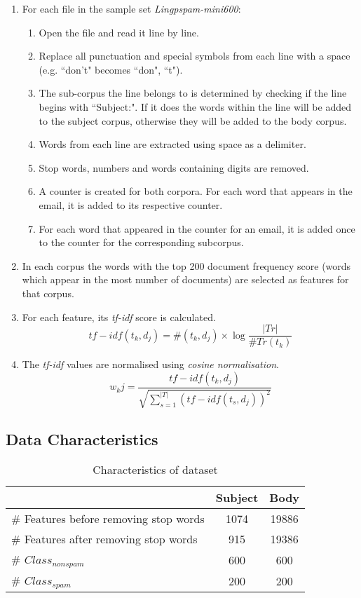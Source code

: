 \documentclass[10pt, a4paper]{article}
\begin{document}
\begin{enumerate}
\item For each file in the sample set \emph{Lingpspam-mini600}:
	\begin{enumerate}[label*=\arabic*.]
	\item Open the file and read it line by line.
	\item Replace all punctuation and special symbols from each line with a space (e.g. ``don't" becomes ``don", ``t").
	\item The sub-corpus the line belongs to is determined by checking if the line begins with ``Subject:". If it does the words within the line will be added to the subject corpus, otherwise they will be added to the body corpus.
	\item Words from each line are extracted using space as a delimiter.
	\item Stop words, numbers and words containing digits are removed.
	\item A counter is created for both corpora. For each word that appears in the email, it is added to its respective counter.
	\item For each word that appeared in the counter for an email, it is added once to the counter for the corresponding subcorpus.
	\end{enumerate}
\item In each corpus the words with the top 200 document frequency score (words which appear in the most number of documents) are selected as features for that corpus.
\item For each feature, its \emph{tf-idf} score is calculated.
$$ tf-idf(t_k, d_j) = \#(t_k, d_j) \times \log \frac{|Tr|}{\#Tr(t_k)} $$
\item The \emph{tf-idf} values are normalised using \emph{cosine normalisation}.
$$ w_kj = \frac{tf-idf(t_k, d_j)}{\sqrt{\sum_{s=1}^{|T|} (tf-idf(t_s, d_j))^2 }} $$
\end{enumerate}

\subsection{Data Characteristics}

\setlength\extrarowheight{3pt}
\begin{table}[H]
\centering
\caption{Characteristics of dataset}\vspace{1em}
\begin{tabular}{|l||c|c|}
\hline
& \textbf{Subject} & \textbf{Body} \\
\hline\hline
\# Features before removing stop words & 1074 & 19886 \\
\# Features after removing stop words & 915 & 19386 \\
\# $Class_{nonspam}$ & 600 & 600 \\
\# $Class_{spam}$ & 200 & 200 \\
\hline
\end{tabular}
\label{table:datacharacteristics}
\end{table}
\end{document}
